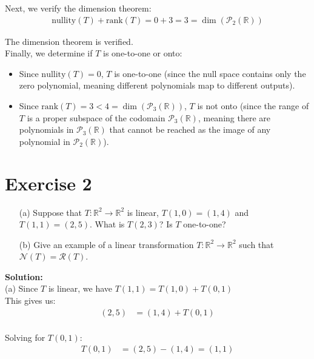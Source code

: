 \documentclass{article}
\begin{document}
Next, we verify the dimension theorem:
\begin{align*}
    \text{nullity}(T) + \text{rank}(T) = 0 + 3 = 3 = \dim(\mathcal{P}_2(\mathbb{R}))
\end{align*}

The dimension theorem is verified. \\

Finally, we determine if $T$ is one-to-one or onto:
\begin{itemize}
    \item Since $\text{nullity}(T) = 0$, $T$ is one-to-one (since the null space contains only the zero polynomial, meaning different polynomials map to different outputs).
    \item Since $\text{rank}(T) = 3 < 4 = \dim(\mathcal{P}_3(\mathbb{R}))$, $T$ is not onto (since the range of $T$ is a proper subspace of the codomain $\mathcal{P}_3(\mathbb{R})$, meaning there are polynomials in $\mathcal{P}_3(\mathbb{R})$ that cannot be reached as the image of any polynomial in $\mathcal{P}_2(\mathbb{R})$).
\end{itemize}

\newpage

\section*{Exercise 2}
\begin{itemize}
    \item[(a)] Suppose that $T : \mathbb{R}^2 \to \mathbb{R}^2$ is linear, $T(1,0) = (1,4)$ and $T(1,1) = (2,5)$. What is $T(2,3)$? Is $T$ one-to-one?

    \item[(b)] Give an example of a linear transformation $T : \mathbb{R}^2 \to \mathbb{R}^2$ such that $\mathcal{N}(T) = \mathcal{R}(T)$.
\end{itemize}

\textbf{Solution: }\\

(a) Since $T$ is linear, we have $T(1,1) = T(1,0) + T(0,1)$ \\

This gives us:
\begin{align*}
(2,5) &= (1,4) + T(0,1)\\
\end{align*}

Solving for $T(0,1)$:
\begin{align*}
T(0,1) &= (2,5) - (1,4) = (1,1)\\
\end{align*}
\end{document}
